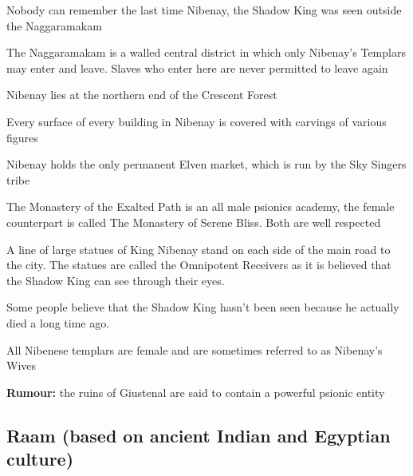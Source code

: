 \begin{multicols}{2}
\begin{description}
    \item Nobody can remember the last time Nibenay, the Shadow King was seen outside the Naggaramakam
    \item The Naggaramakam is a walled central district in which only Nibenay’s Templars may enter and leave. Slaves who enter here are never permitted to leave again
    \item Nibenay lies at the northern end of the Crescent Forest
    \item Every surface of every building in Nibenay is covered with carvings of various figures
    \item Nibenay holds the only permanent Elven market, which is run by the Sky Singers tribe
    \item The Monastery of the Exalted Path is an all male psionics academy, the female counterpart is called The Monastery of Serene Bliss. Both are well respected
    \item A line of large statues of King Nibenay stand on each side of the main road to the city. The statues are called the Omnipotent Receivers as it is believed that the Shadow King can see through their eyes.
    \item Some people believe that the Shadow King hasn’t been seen because he actually died a long time ago.
    \item All Nibenese templars are female and are sometimes referred to as Nibenay’s Wives
    \item \textbf{Rumour:} the ruins of Giustenal are said to contain a powerful psionic entity
\end{description}

\subsection{Raam (based on ancient Indian and Egyptian culture)}


\end{multicols}
